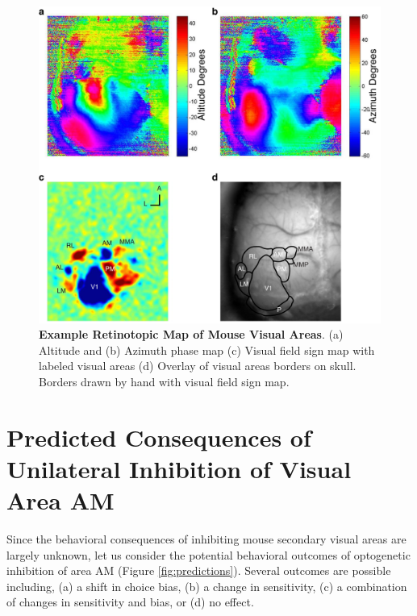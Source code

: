 \begin{figure}
  \centering
   \includegraphics[width=\textwidth]{Figures/chapter4/retino_maps.png}
  \caption[Example Retinotopic Map of Mouse Visual Areas]{\textbf{Example Retinotopic Map of Mouse Visual Areas}. (a) Altitude and (b) Azimuth phase map (c) Visual field sign map with labeled visual areas (d) Overlay of visual areas borders on skull. Borders drawn by hand with visual field sign map.}
   \label{fig:retinomap}
\end{figure}
\section{Predicted Consequences of Unilateral Inhibition of Visual Area AM}
Since the behavioral consequences of inhibiting mouse secondary visual areas are largely unknown, let us consider the potential behavioral outcomes of optogenetic inhibition of area AM (Figure \ref{fig:predictions}). Several outcomes are possible including, (a) a shift in choice bias, (b) a change in sensitivity, (c) a combination of changes in sensitivity and bias, or (d) no effect. 


